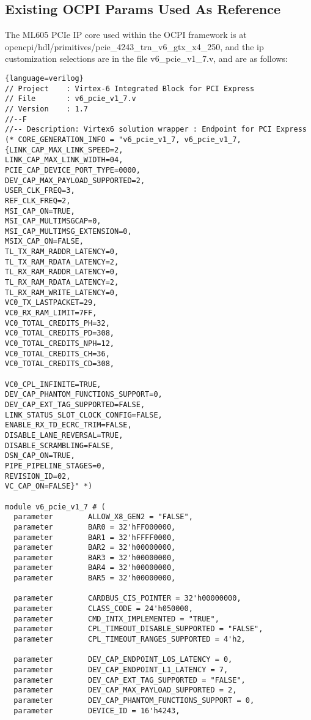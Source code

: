 \subsection{Existing OCPI Params Used As Reference}
The ML605 PCIe IP core used within the OCPI framework is at opencpi/hdl/primitives/pcie\_4243\_trn\_v6\_gtx\_x4\_250, and the ip customization selections are in the file v6\_pcie\_v1\_7.v, and are as follows:
\begin{lstlisting}{language=verilog}
// Project    : Virtex-6 Integrated Block for PCI Express
// File       : v6_pcie_v1_7.v
// Version    : 1.7
//--F
//-- Description: Virtex6 solution wrapper : Endpoint for PCI Express
(* CORE_GENERATION_INFO = "v6_pcie_v1_7, v6_pcie_v1_7, {LINK_CAP_MAX_LINK_SPEED=2,
LINK_CAP_MAX_LINK_WIDTH=04,
PCIE_CAP_DEVICE_PORT_TYPE=0000,
DEV_CAP_MAX_PAYLOAD_SUPPORTED=2,
USER_CLK_FREQ=3,
REF_CLK_FREQ=2,
MSI_CAP_ON=TRUE,
MSI_CAP_MULTIMSGCAP=0,
MSI_CAP_MULTIMSG_EXTENSION=0,
MSIX_CAP_ON=FALSE,
TL_TX_RAM_RADDR_LATENCY=0,
TL_TX_RAM_RDATA_LATENCY=2,
TL_RX_RAM_RADDR_LATENCY=0,
TL_RX_RAM_RDATA_LATENCY=2,
TL_RX_RAM_WRITE_LATENCY=0,
VC0_TX_LASTPACKET=29,
VC0_RX_RAM_LIMIT=7FF,
VC0_TOTAL_CREDITS_PH=32,
VC0_TOTAL_CREDITS_PD=308,
VC0_TOTAL_CREDITS_NPH=12,
VC0_TOTAL_CREDITS_CH=36,
VC0_TOTAL_CREDITS_CD=308,

VC0_CPL_INFINITE=TRUE,
DEV_CAP_PHANTOM_FUNCTIONS_SUPPORT=0,
DEV_CAP_EXT_TAG_SUPPORTED=FALSE,
LINK_STATUS_SLOT_CLOCK_CONFIG=FALSE,
ENABLE_RX_TD_ECRC_TRIM=FALSE,
DISABLE_LANE_REVERSAL=TRUE,
DISABLE_SCRAMBLING=FALSE,
DSN_CAP_ON=TRUE,
PIPE_PIPELINE_STAGES=0,
REVISION_ID=02,
VC_CAP_ON=FALSE}" *)

module v6_pcie_v1_7 # (
  parameter        ALLOW_X8_GEN2 = "FALSE",
  parameter        BAR0 = 32'hFF000000,
  parameter        BAR1 = 32'hFFFF0000,
  parameter        BAR2 = 32'h00000000,
  parameter        BAR3 = 32'h00000000,
  parameter        BAR4 = 32'h00000000,
  parameter        BAR5 = 32'h00000000,

  parameter        CARDBUS_CIS_POINTER = 32'h00000000,
  parameter        CLASS_CODE = 24'h050000,
  parameter        CMD_INTX_IMPLEMENTED = "TRUE",
  parameter        CPL_TIMEOUT_DISABLE_SUPPORTED = "FALSE",
  parameter        CPL_TIMEOUT_RANGES_SUPPORTED = 4'h2,

  parameter        DEV_CAP_ENDPOINT_L0S_LATENCY = 0,
  parameter        DEV_CAP_ENDPOINT_L1_LATENCY = 7,
  parameter        DEV_CAP_EXT_TAG_SUPPORTED = "FALSE",
  parameter        DEV_CAP_MAX_PAYLOAD_SUPPORTED = 2,
  parameter        DEV_CAP_PHANTOM_FUNCTIONS_SUPPORT = 0,
  parameter        DEVICE_ID = 16'h4243,


\end{lstlisting}

